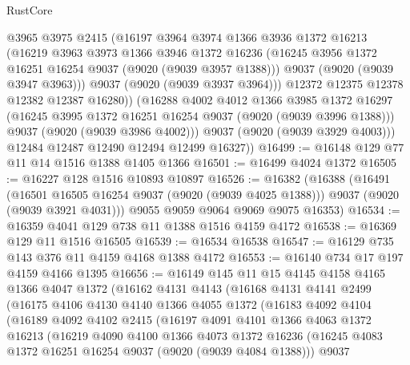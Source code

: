 \begin{lexlean}{RustCore}
\begin{coremodule}
              @3965
              @3975
              @2415
              (@16197
                @3964
                @3974
                @1366
                @3936
                @1372
                @16213
                (@16219
                  @3963
                  @3973
                  @1366
                  @3946
                  @1372
                  @16236
                  (@16245 @3956 @1372 @16251 @16254 @9037 (@9020 (@9039 @3957 @1388)))
                  @9037
                  (@9020 (@9039 @3947 @3963)))
                @9037
                (@9020 (@9039 @3937 @3964)))
              @12372
              @12375
              @12378
              @12382
              @12387
              @16280))
          (@16288
            @4002
            @4012
            @1366
            @3985
            @1372
            @16297
            (@16245 @3995 @1372 @16251 @16254 @9037 (@9020 (@9039 @3996 @1388)))
            @9037
            (@9020 (@9039 @3986 @4002)))
          @9037
          (@9020 (@9039 @3929 @4003)))
        @12484
        @12487
        @12490
        @12494
        @12499
        @16327))
@16499 := @16148 @129 @77 @11 @14 @1516 @1388 @1405 @1366
@16501 := @16499 @4024 @1372
@16505 := @16227 @128 @1516 @10893 @10897
@16526 := @16382
    (@16388
      (@16491
        (@16501 @16505 @16254 @9037 (@9020 (@9039 @4025 @1388)))
        @9037
        (@9020 (@9039 @3921 @4031)))
      @9055
      @9059
      @9064
      @9069
      @9075
      @16353)
@16534 := @16359 @4041 @129 @738 @11 @1388 @1516 @4159 @4172
@16538 := @16369 @129 @11 @1516 @16505
@16539 := @16534 @16538
@16547 := @16129 @735 @143 @376 @11 @4159 @4168 @1388 @4172
@16553 := @16140 @734 @17 @197 @4159 @4166 @1395
@16656 := @16149
    @145
    @11
    @15
    @4145
    @4158
    @4165
    @1366
    @4047
    @1372
    (@16162
      @4131
      @4143
      (@16168
        @4131
        @4141
        @2499
        (@16175
          @4106
          @4130
          @4140
          @1366
          @4055
          @1372
          (@16183
            @4092
            @4104
            (@16189
              @4092
              @4102
              @2415
              (@16197
                @4091
                @4101
                @1366
                @4063
                @1372
                @16213
                (@16219
                  @4090
                  @4100
                  @1366
                  @4073
                  @1372
                  @16236
                  (@16245 @4083 @1372 @16251 @16254 @9037 (@9020 (@9039 @4084 @1388)))
                  @9037

\end{coremodule}
\end{lexlean}
